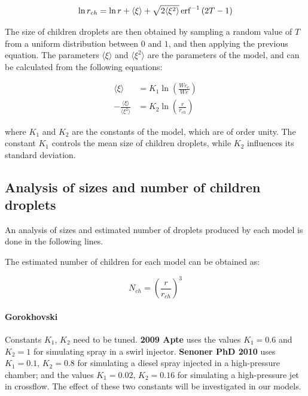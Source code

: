  
\begin{equation}
\ln r_{ch} = \ln r + \langle \xi \rangle  + \sqrt{2 \langle \xi^2 \rangle} \operatorname{erf}^{-1} \left(  2 T - 1 \right)
\end{equation}

The size of children droplets are then obtained by sampling a random value of $T$ from a uniform distribution between $0$ and $1$, and then applying the previous equation. The parameters $\langle \xi \rangle$ and $\langle \xi^2 \rangle$ are the parameters of the model, and can be calculated from the following equations:

\begin{subequations}
\label{eq:gorokhovski_epsilon_parameters_definition}
\begin{align}
\langle \xi \rangle &=  K_1 \ln \left(  \frac{We_c}{We}  \right) \\
- \frac{\langle \xi \rangle}{\langle \xi^2 \rangle} &=  K_2 \ln \left( \frac{r}{r_{ch}} \right)
\end{align}
\end{subequations}

where $K_1$ and $K_2$ are the constants of the model, which are of order unity. The constant $K_1$ controls the mean size of children droplets, while $K_2$ influences its standard deviation.






\subsection{Analysis of sizes and number of children droplets}

An analysis of sizes and estimated number of droplets produced by each model is done in the following lines.

The estimated number of children for each model can be obtained as:

\begin{equation}
N_{ch} = \left( \frac{r}{r_{ch}} \right)^3
\end{equation}

\paragraph{Gorokhovski} Constants $K_1$, $K_2$ need to be tuned. \textbf{2009 Apte} uses the values $K_1 = 0.6$ and $K_2 = 1$ for simulating spray in a swirl injector. \textbf{Senoner PhD 2010} uses $K_1 = 0.1$, $K_2 = 0.8$ for simulating a diesel spray injected in a high-pressure chamber; and the values  $K_1 = 0.02$, $K_2 = 0.16$ for simulating a high-pressure jet in crossflow. The effect of these two constants will be investigated in our models.

